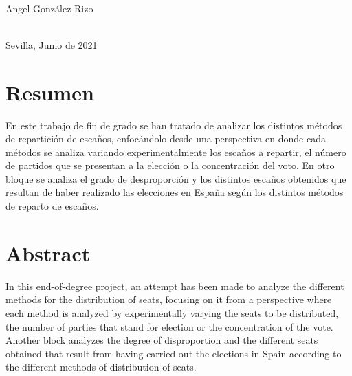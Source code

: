 \documentclass[12pt,a4paper,]{book}
\def\ifdoblecara{} %
\numberwithin{dummy}{section}
\theoremstyle{ocrenumbox}
\theoremstyle{blacknumex}
\theoremstyle{blacknumbox}
\theoremstyle{ocrenum}
\theoremstyle{ocrenum}
\begin{document}
\begin{titlepage}
\begin{minipage}{14cm}
\HRule \\[4cm]


{\Large

Angel González Rizo} \\[0.5cm]

{\large
Sevilla, Junio de 2021
}

\end{minipage}

\vfill %

\cleardoublepage
\thispagestyle{empty}
\end{titlepage}

\raggedbottom


\setlength{\parindent}{1em}

\pagestyle{fancy}
\ifdefined\ifdoblecara
\fancyhead[LE,RO]{}
\fancyhead[LO,RE]{}
\else
\fancyhead[RO]{}
\fancyhead[LO]{}
\fi
\renewcommand{\headrulewidth}{0pt}
\renewcommand{\footrulewidth}{0pt}

\setcounter{tocdepth}{2}
\tableofcontents

\cleardoublepage

\section*{Resumen}

En este trabajo de fin de grado se han tratado de analizar los distintos
métodos de repartición de escaños, enfocándolo desde una perspectiva en
donde cada métodos se analiza variando experimentalmente los escaños a
repartir, el número de partidos que se presentan a la elección o la
concentración del voto. En otro bloque se analiza el grado de
desproporción y los distintos escaños obtenidos que resultan de haber
realizado las elecciones en España según los distintos métodos de
reparto de escaños.

\clearpage
\section*{Abstract}

In this end-of-degree project, an attempt has been made to analyze the
different methods for the distribution of seats, focusing on it from a
perspective where each method is analyzed by experimentally varying the
seats to be distributed, the number of parties that stand for election
or the concentration of the vote. Another block analyzes the degree of
disproportion and the different seats obtained that result from having
carried out the elections in Spain according to the different methods of
distribution of seats.
\end{document}
